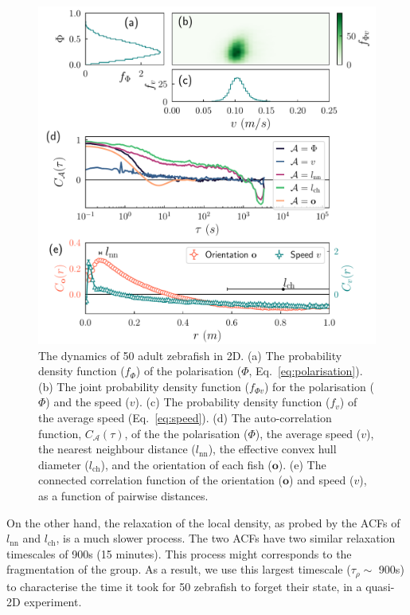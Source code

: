 \documentclass[11pt,twoside]{report}
\begin{document}
\begin{figure}
  \includegraphics[width=\linewidth]{dynamics-2d-50}
  \caption[The dynamics of 50 fish in 2D]{
  	The dynamics of 50 adult zebrafish in 2D.
  	(a) The probability density function ($f_\Phi$) of the polarisation ($\Phi$, Eq.~\ref{eq:polarisation}).
  	(b) The joint probability density function ($f_{\Phi v}$) for the polarisation ($\Phi$) and the speed ($v$).
  	(c) The probability density function ($f_v$) of the average speed (Eq.~\ref{eq:speed}).
  	(d) The auto-correlation function, $C_\mathcal{A}(\tau)$, of the the polarisation ($\Phi$), the average speed ($v$), the nearest neighbour distance ($l_\mathrm{nn}$), the effective convex hull diameter ($l_\mathrm{ch}$), and the orientation of each fish ($\mathbf{o}$).
  	(e) The connected correlation function of the orientation ($\mathbf{o}$) and speed ($v$), as a function of pairwise distances.
  }
  \label{fig:dynamics-2d}
\end{figure}


On the other hand, the relaxation of the local density, as probed by the ACFs of $l_\mathrm{nn}$ and $l_\mathrm{ch}$, is a much slower process. The two ACFs have two similar relaxation timescales of 900s (15 minutes). This process might corresponds to the fragmentation of the group. As a result, we use this largest timescale ($\tau_\rho \sim$ 900s) to characterise the time it took for 50 zebrafish to forget their state, in a quasi-2D experiment.
\end{document}
